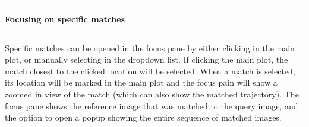 \noindent\rule{\textwidth}{1pt}
\indent \textbf{Focusing on specific matches}
\noindent\rule{\textwidth}{1pt}
\smallskip
\parbox{\textwidth}{Specific matches can be opened in the focus pane by either clicking in the main plot, or manually selecting in the dropdown list. If clicking the main plot, the match closest to the clicked location will be selected. When a match is selected, its location will be marked in the main plot and the focus pain will show a zoomed in view of the match (which can also show the matched trajectory). The focus pane shows the reference image that was matched to the query image, and the option to open a popup showing the entire sequence of matched images.}
\smallskip
